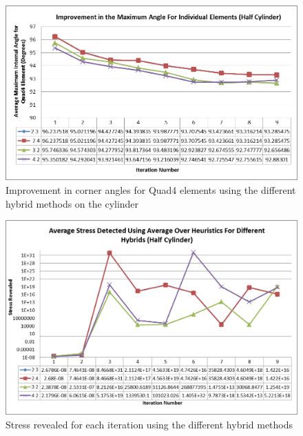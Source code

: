 \begin{figure}[H]
  \centerline{\includegraphics[width=120mm, scale=0.5]{../Graphics/HalfCylinder/ImprovementInMaxCornerAngles.png}}
  \caption{Improvement in corner angles for Quad4 elements using the different hybrid methods on the cylinder}
\end{figure}

\begin{figure}[H]
  \centerline{\includegraphics[width=120mm, scale=0.5]{../Graphics/HalfCylinder/AverageStressDetectedUsingAverageOverHeuristicsForDifferentHybrids(HalfCylinder).png}}
  \caption{Stress revealed for each iteration using the different hybrid methods}
\end{figure}

